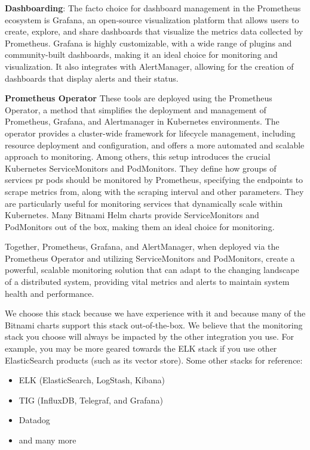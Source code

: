 \documentclass{report}
\begin{document}
    \textbf{Dashboarding}:
    The facto choice for dashboard management in the Prometheus ecosystem is Grafana, an open-source visualization platform that allows users to create, explore, and share dashboards that visualize the metrics data collected by Prometheus. Grafana is highly customizable, with a wide range of plugins and community-built dashboards, making it an ideal choice for monitoring and visualization. It also integrates with AlertManager, allowing for the creation of dashboards that display alerts and their status.

    \textbf{Prometheus Operator}
    These tools are deployed using the Prometheus Operator, a method that simplifies the deployment and management of Prometheus, Grafana, and Alertmanager in Kubernetes environments. The operator provides a cluster-wide framework for lifecycle management, including resource deployment and configuration, and offers a more automated and scalable approach to monitoring. Among others, this setup introduces the crucial Kubernetes ServiceMonitors and PodMonitors. They define how groups of services pr pods should be monitored by Prometheus, specifying the endpoints to scrape metrics from, along with the scraping interval and other parameters. They are particularly useful for monitoring services that dynamically scale within Kubernetes. Many Bitnami Helm charts provide ServiceMonitors and PodMonitors out of the box, making them an ideal choice for monitoring.

    Together, Prometheus, Grafana, and AlertManager, when deployed via the Prometheus Operator and utilizing ServiceMonitors and PodMonitors, create a powerful, scalable monitoring solution that can adapt to the changing landscape of a distributed system, providing vital metrics and alerts to maintain system health and performance.

    We choose this stack because we have experience with it and because many of the Bitnami charts support this stack out-of-the-box. We believe that the monitoring stack you choose will always be impacted by the other integration you use. For example, you may be more geared towards the ELK stack if you use other ElasticSearch products (such as its vector store). Some other stacks for reference:

    \begin{itemize}
        \item ELK (ElasticSearch, LogStash, Kibana)
        \item TIG (InfluxDB, Telegraf, and Grafana)
        \item Datadog
        \item and many more
    \end{itemize}
\end{document}
